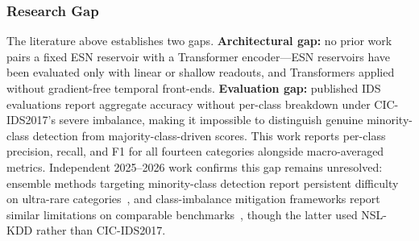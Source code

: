 \documentclass[5p,times]{elsarticle}
\begin{document}
	\subsubsection{Research Gap}
	\label{subsec:gap}
	
	The literature above establishes two gaps. \textbf{Architectural gap:}
	no prior work pairs a fixed ESN reservoir with a Transformer
	encoder---ESN reservoirs have been evaluated only with linear or shallow
	readouts, and Transformers applied without gradient-free temporal
	front-ends. \textbf{Evaluation gap:} published IDS evaluations report
	aggregate accuracy without per-class breakdown under CIC-IDS2017's
	severe imbalance, making it impossible to distinguish genuine
	minority-class detection from majority-class-driven scores. This work
	reports per-class precision, recall, and F1 for all fourteen categories
	alongside macro-averaged metrics. Independent 2025--2026 work confirms
	this gap remains unresolved: ensemble methods targeting minority-class
	detection report persistent difficulty on ultra-rare
	categories~\cite{oh2025mchensemble}, and class-imbalance mitigation
	frameworks report similar limitations on comparable
	benchmarks~\cite{hambali2026breaking}, though the latter used NSL-KDD
	rather than CIC-IDS2017.
	
\end{document}
